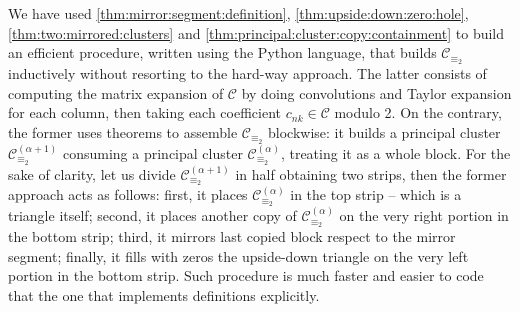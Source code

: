 We have used \autoref{thm:mirror:segment:definition},
\autoref{thm:upside:down:zero:hole}, \autoref{thm:two:mirrored:clusters} and
\autoref{thm:principal:cluster:copy:containment} to build an efficient
procedure, written using the Python language, that builds $\mathcal{C}_{\equiv_{2}}$
inductively without resorting to the hard-way approach. The latter consists of 
computing the matrix expansion of $\mathcal{C}$ by doing convolutions and 
Taylor expansion for each column, then taking each coefficient $c_{nk}\in\mathcal{C}$ modulo 2. 
On the contrary, the former uses theorems to 
assemble $\mathcal{C}_{\equiv_{2}}$ blockwise: it builds a principal cluster 
$\mathcal{C}_{\equiv_{2}}^{(\alpha+1)}$ consuming a principal cluster 
$\mathcal{C}_{\equiv_{2}}^{(\alpha)}$, treating it as a whole block. For the sake of clarity,
let us divide $\mathcal{C}_{\equiv_{2}}^{(\alpha+1)}$ in half obtaining two strips, then the former approach acts as follows:
first, it places $\mathcal{C}_{\equiv_{2}}^{(\alpha)}$ in the top strip -- which is a triangle itself; 
second, it places another copy of $\mathcal{C}_{\equiv_{2}}^{(\alpha)}$ on the very right portion in the bottom strip;
third, it mirrors last copied block respect to the mirror segment; 
finally, it fills with zeros the upside-down triangle on the very left portion in the bottom strip. 
Such procedure is much faster and easier to code that the one that implements definitions explicitly.
